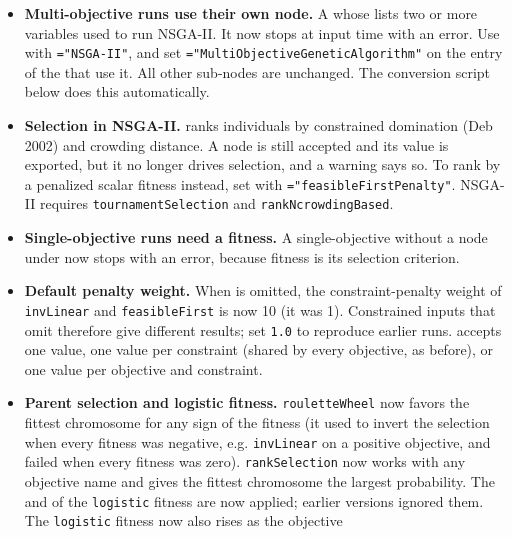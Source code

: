 \begin{itemize}
  \item \textbf{Multi-objective runs use their own node.} A  whose
     lists two or more variables used to run NSGA-II. It now stops at input time
    with an error. Use  with \texttt{="NSGA-II"},
    and set \texttt{="MultiObjectiveGeneticAlgorithm"} on the  entry
    of the  that use it. All other sub-nodes are unchanged. The conversion script
    below does this automatically.
  \item \textbf{Selection in NSGA-II.}  ranks individuals by
    constrained domination (Deb 2002) and crowding distance. A  node is still accepted
    and its value is exported, but it no longer drives selection, and a warning says so. To rank by
    a penalized scalar fitness instead, set  with
    \texttt{="feasibleFirstPenalty"}. NSGA-II requires
    \texttt{tournamentSelection} and
    \texttt{rankNcrowdingBased}.
  \item \textbf{Single-objective runs need a fitness.} A single-objective
     without a  node under  now stops with
    an error, because fitness is its selection criterion.
  \item \textbf{Default penalty weight.} When  is omitted, the constraint-penalty weight of
    \texttt{invLinear} and \texttt{feasibleFirst} is now 10 (it was 1). Constrained inputs that omit
     therefore give different results; set \texttt{1.0} to reproduce earlier runs.
     accepts one value, one value per constraint (shared by every objective, as before),
    or one value per objective and constraint.
  \item \textbf{Parent selection and logistic fitness.} \texttt{rouletteWheel} now favors the fittest
    chromosome for any sign of the fitness (it used to invert the selection when every fitness was
    negative, e.g. \texttt{invLinear} on a positive objective, and failed when every fitness was zero).
    \texttt{rankSelection} now works with any objective name and gives the fittest chromosome the largest
    probability. The  and  of the \texttt{logistic} fitness are now
    applied; earlier versions ignored them. The \texttt{logistic} fitness now also rises as the objective

\end{itemize}
